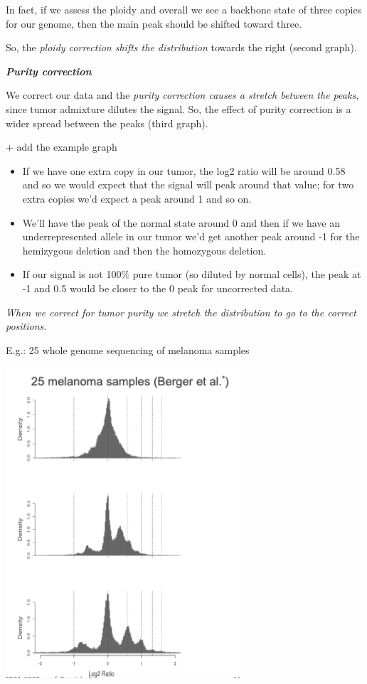 In fact, if we assess the ploidy and overall we see a backbone state of three
copies for our genome, then the main peak should be shifted toward three.

So, the \emph{ploidy correction shifts the distribution} towards the right
(second graph).

\emph{\textbf{Purity correction}}

We correct our data and the \emph{{purity correction causes a stretch between
the peaks}}, since tumor admixture dilutes the signal. So, the effect of purity
correction is a wider spread between the peaks (third graph).

+ add the example graph

\begin{itemize}
\item
  If we have one extra copy in our tumor, the log2 ratio will be around 0.58 and
  so we would expect that the signal will peak around that value; for two extra
  copies we'd expect a peak around 1 and so on.
\item
  We'll have the peak of the normal state around 0 and then if we have an
  underrepresented allele in our tumor we'd get another peak around -1 for the
  hemizygous deletion and then the homozygous deletion.
\item
  If our signal is not 100\% pure tumor (so diluted by normal cells), the peak
  at -1 and 0.5 would be closer to the 0 peak for uncorrected data.
\end{itemize}

\emph{{When we correct for tumor purity we stretch the distribution to go to the
correct positions.}}

E.g.: 25 whole genome sequencing of melanoma samples

\includegraphics[width=3.42917in,height=4.56111in]{image8.png}

